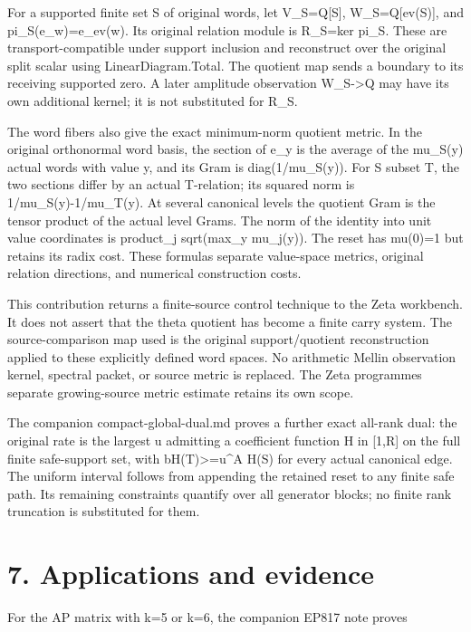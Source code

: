 For a supported finite set S of original words, let V\_S=Q{[}S{]}, W\_S=Q{[}ev(S){]}, and pi\_S(e\_w)=e\_ev(w). Its original relation module is R\_S=ker pi\_S. These are transport-compatible under support inclusion and reconstruct over the original split scalar using LinearDiagram.Total. The quotient map sends a boundary to its receiving supported zero. A later amplitude observation W\_S-\textgreater Q may have its own additional kernel; it is not substituted for R\_S.

The word fibers also give the exact minimum-norm quotient metric. In the original orthonormal word basis, the section of e\_y is the average of the mu\_S(y) actual words with value y, and its Gram is diag(1/mu\_S(y)). For S subset T, the two sections differ by an actual T-relation; its squared norm is 1/mu\_S(y)-1/mu\_T(y). At several canonical levels the quotient Gram is the tensor product of the actual level Grams. The norm of the identity into unit value coordinates is product\_j sqrt(max\_y mu\_j(y)). The reset has mu(0)=1 but retains its radix cost. These formulas separate value-space metrics, original relation directions, and numerical construction costs.

This contribution returns a finite-source control technique to the Zeta workbench. It does not assert that the theta quotient has become a finite carry system. The source-comparison map used is the original support/quotient reconstruction applied to these explicitly defined word spaces. No arithmetic Mellin observation kernel, spectral packet, or source metric is replaced. The Zeta programme\textquotesingle s separate growing-source metric estimate retains its own scope.

The companion compact-global-dual.md proves a further exact all-rank dual: the original rate is the largest u admitting a coefficient function H in {[}1,R{]} on the full finite safe-support set, with bH(T)\textgreater=u\^{}\textbar A\textbar{} H(S) for every actual canonical edge. The uniform interval follows from appending the retained reset to any finite safe path. Its remaining constraints quantify over all generator blocks; no finite rank truncation is substituted for them.

\section{7. Applications and evidence}\label{n06-applications-and-evidence}

For the AP matrix with k=5 or k=6, the companion EP817 note proves

